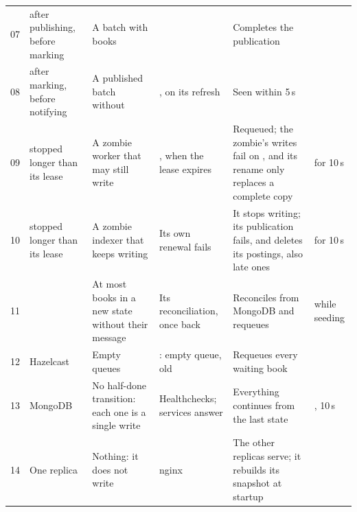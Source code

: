 \begin{table}[!ht]
\begin{tabularx}{\textwidth}{@{}L{0.65cm}L{2.75cm}L{2.85cm}L{2.2cm}YL{2.65cm}@{}}
07 &  after publishing, before marking & A  batch with  books &  & Completes the publication &  \\
08 &  after marking, before notifying & A published batch without  & , on its refresh & Seen within 5\,s &  \\
09 &  stopped longer than its lease & A zombie worker that may still write & , when the lease expires & Requeued; the zombie's writes fail on , and its rename only replaces a complete copy &  for 10\,s \\
10 &  stopped longer than its lease & A zombie indexer that keeps writing & Its own renewal fails & It stops writing; its publication fails, and  deletes its postings, also late ones &  for 10\,s \\
11 &  & At most books in a new state without their message & Its reconciliation, once back & Reconciles from MongoDB and requeues &  while seeding \\
12 & Hazelcast & Empty queues & : empty queue, old  & Requeues every waiting book &  \\
13 & MongoDB & No half-done transition: each one is a single write & Healthchecks; services answer  & Everything continues from the last state & , 10\,s \\
14 & One  replica & Nothing: it does not write & nginx & The other replicas serve; it rebuilds its snapshot at startup &  \\
\bottomrule
\end{tabularx}
\end{table}
